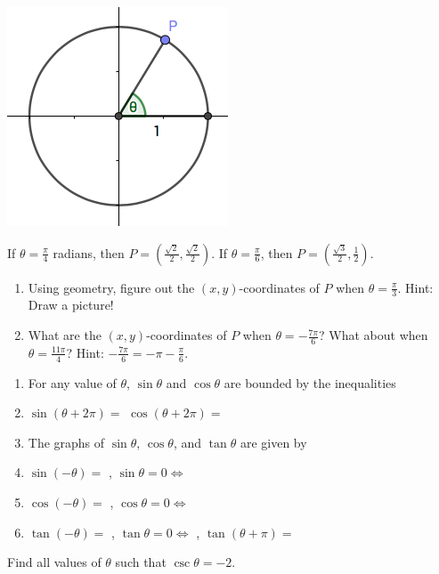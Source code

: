 \documentclass[12pt, a4paper]{article}
\begin{document}
\begin{minipage}{0.2\linewidth}
  \includegraphics[scale=0.5]{images/unit-circle}
\end{minipage}
\begin{ex}
  If \(\theta = \frac{\pi}{4}\) radians, then \(P = \left(\frac{\sqrt{2}}{2},
  \frac{\sqrt{2}}{2}\right)\). If \(\theta = \frac{\pi}{6}\), then \(P =
  \left(\frac{\sqrt{3}}{2}, \frac{1}{2}\right)\).
  \begin{enumerate}
  \item Using geometry, figure out the \((x,y)\)-coordinates of \(P\)
    when \(\theta = \frac{\pi}{3}\). Hint: Draw a picture!
  \vspace{1in}
  \item What are the \((x,y)\)-coordinates of \(P\) when \(\theta =
    -\frac{7\pi}{6}\)? What about when \(\theta = \frac{11 \pi}{4}\)?
    Hint: \(-\frac{7\pi}{6} = -\pi-\frac{\pi}{6}\). 
  \vspace{1in}
  \end{enumerate}
\end{ex}
\vspace{-1.5in}
\begin{thrm}
  \begin{enumerate}
  \item For any value of \(\theta\), \(\sin \theta\) and \(\cos
    \theta\) are bounded by the inequalities
    \vspace{0.5in}
  \item \(\sin(\theta + 2\pi) = \) \hspace{1in} \(\cos(\theta+2\pi)=\)
  \item The graphs of \(\sin \theta\), \(\cos \theta\), and \(\tan
    \theta\) are given by
    \vspace{1.5in}
  \item \(\sin (-\theta) = \) \hspace{1in}, \(\sin \theta = 0 \iff \)
  \item \(\cos (-\theta) = \) \hspace{1in}, \(\cos \theta = 0 \iff \)
  \item \(\tan(-\theta) = \) \hspace{1in}, \(\tan \theta = 0 \iff \)
    \hspace{1in}, \(\tan(\theta + \pi) = \) 
  \end{enumerate}
\end{thrm}
\begin{ex}
  Find all values of \(\theta\) such that \(\csc \theta = -2\).
\end{ex}
\end{document}
